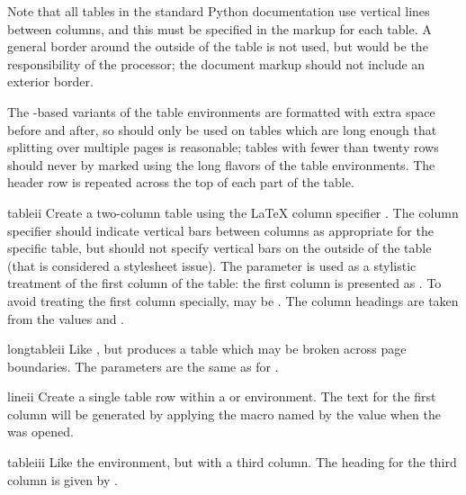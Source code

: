 \documentclass{howto}
\begin{document}
    Note that all tables in the standard Python documentation use
    vertical lines between columns, and this must be specified in the
    markup for each table.  A general border around the outside of the
    table is not used, but would be the responsibility of the
    processor; the document markup should not include an exterior
    border.

    The -based variants of the table environments are
    formatted with extra space before and after, so should only be
    used on tables which are long enough that splitting over multiple
    pages is reasonable; tables with fewer than twenty rows should
    never by marked using the long flavors of the table environments.
    The header row is repeated across the top of each part of the
    table.

    \begin{envdesc}{tableii}{}
      Create a two-column table using the \LaTeX{} column specifier
      .  The column specifier should indicate vertical
      bars between columns as appropriate for the specific table, but
      should not specify vertical bars on the outside of the table
      (that is considered a stylesheet issue).  The 
      parameter is used as a stylistic treatment of the first column
      of the table: the first column is presented as
      .  To avoid treating the first
      column specially,  may be .  The
      column headings are taken from the values  and
      .
    \end{envdesc}

    \begin{envdesc}{longtableii}{\unspecified}
      Like , but produces a table which may be broken
      across page boundaries.  The parameters are the same as for
      .
    \end{envdesc}

    \begin{macrodesc}{lineii}{}
      Create a single table row within a  or
       environment.
      The text for the first column will be generated by applying the
      macro named by the  value when the 
      was opened.
    \end{macrodesc}

    \begin{envdesc}{tableiii}{}
      Like the  environment, but with a third column.
      The heading for the third column is given by .
    \end{envdesc}
\end{document}
